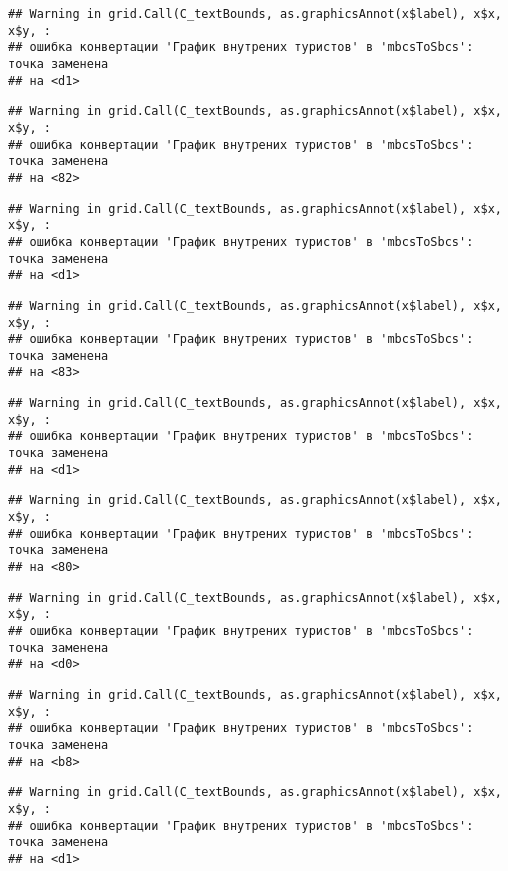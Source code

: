 \documentclass[
]{article}
\begin{document}
\begin{verbatim}
## Warning in grid.Call(C_textBounds, as.graphicsAnnot(x$label), x$x, x$y, :
## ошибка конвертации 'График внутрених туристов' в 'mbcsToSbcs': точка заменена
## на <d1>
\end{verbatim}

\begin{verbatim}
## Warning in grid.Call(C_textBounds, as.graphicsAnnot(x$label), x$x, x$y, :
## ошибка конвертации 'График внутрених туристов' в 'mbcsToSbcs': точка заменена
## на <82>
\end{verbatim}

\begin{verbatim}
## Warning in grid.Call(C_textBounds, as.graphicsAnnot(x$label), x$x, x$y, :
## ошибка конвертации 'График внутрених туристов' в 'mbcsToSbcs': точка заменена
## на <d1>
\end{verbatim}

\begin{verbatim}
## Warning in grid.Call(C_textBounds, as.graphicsAnnot(x$label), x$x, x$y, :
## ошибка конвертации 'График внутрених туристов' в 'mbcsToSbcs': точка заменена
## на <83>
\end{verbatim}

\begin{verbatim}
## Warning in grid.Call(C_textBounds, as.graphicsAnnot(x$label), x$x, x$y, :
## ошибка конвертации 'График внутрених туристов' в 'mbcsToSbcs': точка заменена
## на <d1>
\end{verbatim}

\begin{verbatim}
## Warning in grid.Call(C_textBounds, as.graphicsAnnot(x$label), x$x, x$y, :
## ошибка конвертации 'График внутрених туристов' в 'mbcsToSbcs': точка заменена
## на <80>
\end{verbatim}

\begin{verbatim}
## Warning in grid.Call(C_textBounds, as.graphicsAnnot(x$label), x$x, x$y, :
## ошибка конвертации 'График внутрених туристов' в 'mbcsToSbcs': точка заменена
## на <d0>
\end{verbatim}

\begin{verbatim}
## Warning in grid.Call(C_textBounds, as.graphicsAnnot(x$label), x$x, x$y, :
## ошибка конвертации 'График внутрених туристов' в 'mbcsToSbcs': точка заменена
## на <b8>
\end{verbatim}

\begin{verbatim}
## Warning in grid.Call(C_textBounds, as.graphicsAnnot(x$label), x$x, x$y, :
## ошибка конвертации 'График внутрених туристов' в 'mbcsToSbcs': точка заменена
## на <d1>
\end{verbatim}
\end{document}
